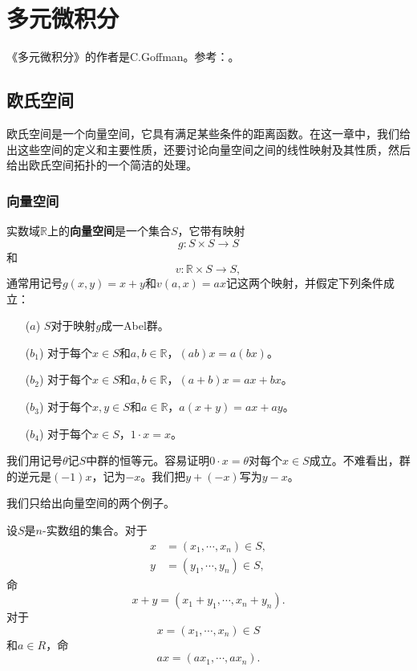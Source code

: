 \chapter{多元微积分}
《多元微积分》的作者是C.Goffman。参考：\cite{CalculusOfMultiVariables1978}。

\section{欧氏空间}\label{section00301}
欧氏空间是一个向量空间，它具有满足某些条件的距离函数。在这一章中，我们给出这些空间的定义和主要性质，还要讨论向量空间之间的线性映射及其性质，然后给出欧氏空间拓扑的一个简洁的处理。


\subsection{向量空间}\label{subsection0030101}
实数域$\mathbb{R}$上的\textbf{向量空间}是一个集合$S$，它带有映射
\[
g: S \times S \to S
\]
和
\[
v: \mathbb{R} \times S \to S,
\]
通常用记号$g(x,y) = x+y$和$v(a,x)=ax$记这两个映射，并假定下列条件成立：
\begin{enumerate}
\item[($a$)] $S$对于映射$g$成一Abel群。
\item[($b_1$)]对于每个$x \in S$和$a, b \in \mathbb{R}$，$(ab)x = a(bx)$。
\item[($b_2$)]对于每个$x \in S$和$a, b \in \mathbb{R}$，$(a+b)x=ax+bx$。
\item[($b_3$)]对于每个$x, y \in S$和$a \in \mathbb{R}$，$a(x+y)=ax+ay$。
\item[($b_4$)]对于每个$x \in S$，$1 \cdot x = x$。
\end{enumerate}

我们用记号$\theta$记$S$中群的恒等元。容易证明$0 \cdot x = \theta$对每个$x \in S$成立。不难看出，群的逆元是$(-1)x$，记为$-x$。我们把$y+(-x)$写为$y-x$。

我们只给出向量空间的两个例子。
\begin{example}
设$S$是$n$-实数组的集合。对于
\[
\begin{aligned}
x &= (x_1, \cdots, x_n) \in S,\\
y &= (y_1, \cdots, y_n) \in S,
\end{aligned}
\]
命
\[
x+y = (x_1+y_1, \cdots, x_n+y_n).
\]
对于
\[
x = (x_1, \cdots, x_n) \in S
\]
和$a \in R$，命
\[
ax = (ax_1, \cdots, ax_n).
\]
\end{example}








